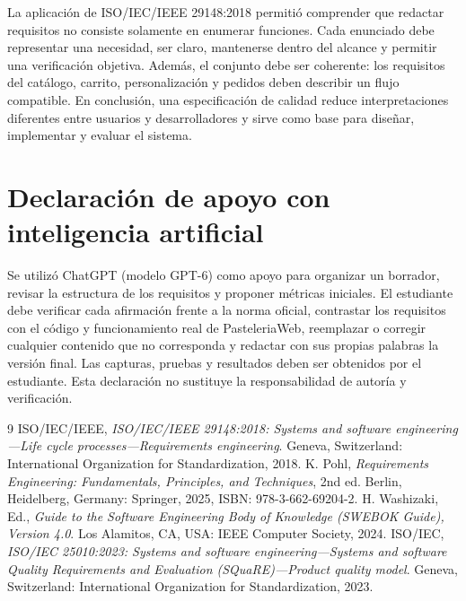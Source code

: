 \documentclass[11pt,a4paper]{article}
\begin{document}
La aplicación de ISO/IEC/IEEE 29148:2018 permitió comprender que redactar requisitos no consiste solamente en enumerar funciones. Cada enunciado debe representar una necesidad, ser claro, mantenerse dentro del alcance y permitir una verificación objetiva. Además, el conjunto debe ser coherente: los requisitos del catálogo, carrito, personalización y pedidos deben describir un flujo compatible. En conclusión, una especificación de calidad reduce interpretaciones diferentes entre usuarios y desarrolladores y sirve como base para diseñar, implementar y evaluar el sistema.

\section{Declaración de apoyo con inteligencia artificial}
Se utilizó ChatGPT (modelo GPT-6) como apoyo para organizar un borrador, revisar la estructura de los requisitos y proponer métricas iniciales. El estudiante debe verificar cada afirmación frente a la norma oficial, contrastar los requisitos con el código y funcionamiento real de PasteleriaWeb, reemplazar o corregir cualquier contenido que no corresponda y redactar con sus propias palabras la versión final. Las capturas, pruebas y resultados deben ser obtenidos por el estudiante. Esta declaración no sustituye la responsabilidad de autoría y verificación.

\begin{thebibliography}{9}
 ISO/IEC/IEEE, \textit{ISO/IEC/IEEE 29148:2018: Systems and software engineering---Life cycle processes---Requirements engineering}. Geneva, Switzerland: International Organization for Standardization, 2018.
 K. Pohl, \textit{Requirements Engineering: Fundamentals, Principles, and Techniques}, 2nd ed. Berlin, Heidelberg, Germany: Springer, 2025, ISBN: 978-3-662-69204-2.
 H. Washizaki, Ed., \textit{Guide to the Software Engineering Body of Knowledge (SWEBOK Guide), Version 4.0}. Los Alamitos, CA, USA: IEEE Computer Society, 2024.
 ISO/IEC, \textit{ISO/IEC 25010:2023: Systems and software engineering---Systems and software Quality Requirements and Evaluation (SQuaRE)---Product quality model}. Geneva, Switzerland: International Organization for Standardization, 2023.
\end{thebibliography}
\end{document}
